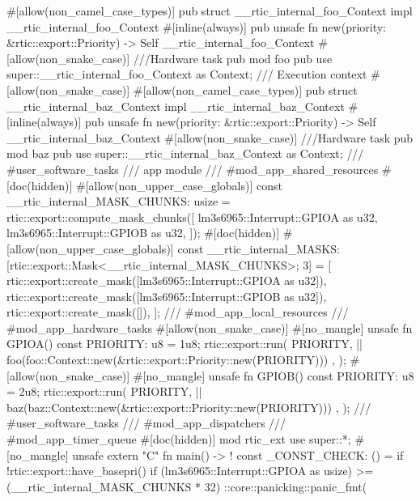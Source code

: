{    #[allow(non_camel_case_types)]
    pub struct __rtic_internal_foo_Context {}
    impl __rtic_internal_foo_Context {
        #[inline(always)]
        pub unsafe fn new(priority: &rtic::export::Priority) -> Self {
            __rtic_internal_foo_Context {}
        }
    }
    #[allow(non_snake_case)]
    ///Hardware task
    pub mod foo {
        pub use super::__rtic_internal_foo_Context as Context;
    }
    /// Execution context
    #[allow(non_snake_case)]
    #[allow(non_camel_case_types)]
    pub struct __rtic_internal_baz_Context {}
    impl __rtic_internal_baz_Context {
        #[inline(always)]
        pub unsafe fn new(priority: &rtic::export::Priority) -> Self {
            __rtic_internal_baz_Context {}
        }
    }
    #[allow(non_snake_case)]
    ///Hardware task
    pub mod baz {
        pub use super::__rtic_internal_baz_Context as Context;
    }
    /// #user_software_tasks
    /// app module
    /// #mod_app_shared_resources
    #[doc(hidden)]
    #[allow(non_upper_case_globals)]
    const __rtic_internal_MASK_CHUNKS: usize = rtic::export::compute_mask_chunks([
        lm3s6965::Interrupt::GPIOA as u32,
        lm3s6965::Interrupt::GPIOB as u32,
    ]);
    #[doc(hidden)]
    #[allow(non_upper_case_globals)]
    const __rtic_internal_MASKS: [rtic::export::Mask<__rtic_internal_MASK_CHUNKS>; 3] = [
        rtic::export::create_mask([lm3s6965::Interrupt::GPIOA as u32]),
        rtic::export::create_mask([lm3s6965::Interrupt::GPIOB as u32]),
        rtic::export::create_mask([]),
    ];
    /// #mod_app_local_resources
    /// #mod_app_hardware_tasks
    #[allow(non_snake_case)]
    #[no_mangle]
    unsafe fn GPIOA() {
        const PRIORITY: u8 = 1u8;
        rtic::export::run(
            PRIORITY,
            || { foo(foo::Context::new(&rtic::export::Priority::new(PRIORITY))) },
        );
    }
    #[allow(non_snake_case)]
    #[no_mangle]
    unsafe fn GPIOB() {
        const PRIORITY: u8 = 2u8;
        rtic::export::run(
            PRIORITY,
            || { baz(baz::Context::new(&rtic::export::Priority::new(PRIORITY))) },
        );
    }
    /// #user_software_tasks
    /// #mod_app_dispatchers
    /// #mod_app_timer_queue
    #[doc(hidden)]
    mod rtic_ext {
        use super::*;
        #[no_mangle]
        unsafe extern "C" fn main() -> ! {
            const _CONST_CHECK: () = {
                if !rtic::export::have_basepri() {
                    if (lm3s6965::Interrupt::GPIOA as usize)
                        >= (__rtic_internal_MASK_CHUNKS * 32)
                    {
                        {
                            ::core::panicking::panic_fmt(
}}}}}}}
